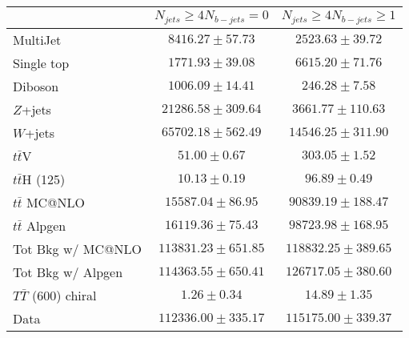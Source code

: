 \begin{tabular}{l c c } \toprule\toprule
 & $N_{jets}\geq 4$$N_{b-jets}= 0$ 		 & $N_{jets}\geq 4$$N_{b-jets}\geq 1$ 		 \\ \midrule 
  MultiJet  & $8416.27 \pm 57.73$  & $2523.63 \pm 39.72$ \\ 
 Single top  & $1771.93 \pm 39.08$  & $6615.20 \pm 71.76$ \\ 
 Diboson  & $1006.09 \pm 14.41$  & $246.28 \pm 7.58$ \\ 
 $Z$+jets  & $21286.58 \pm 309.64$  & $3661.77 \pm 110.63$ \\ 
 $W$+jets  & $65702.18 \pm 562.49$  & $14546.25 \pm 311.90$ \\ 
 $t\bar{t}$V  & $51.00 \pm 0.67$  & $303.05 \pm 1.52$ \\ 
 $t\bar{t}$H (125)  & $10.13 \pm 0.19$  & $96.89 \pm 0.49$ \\ 
 $t\bar{t}$ MC@NLO  & $15587.04 \pm 86.95$  & $90839.19 \pm 188.47$ \\ 
 $t\bar{t}$ Alpgen  & $16119.36 \pm 75.43$  & $98723.98 \pm 168.95$ \\ 
\midrule 
  Tot Bkg w/ MC@NLO  & $113831.23 \pm 651.85$  & $118832.25 \pm 389.65$ \\ \midrule 
 \midrule 
  Tot Bkg w/ Alpgen  & $114363.55 \pm 650.41$  & $126717.05 \pm 380.60$ \\ \midrule 
  $T\bar{T}$ (600) chiral  & $1.26 \pm 0.34$  & $14.89 \pm 1.35$ \\ 
 Data  & $112336.00 \pm 335.17$  & $115175.00 \pm 339.37$ \\ 
\bottomrule\end{tabular}